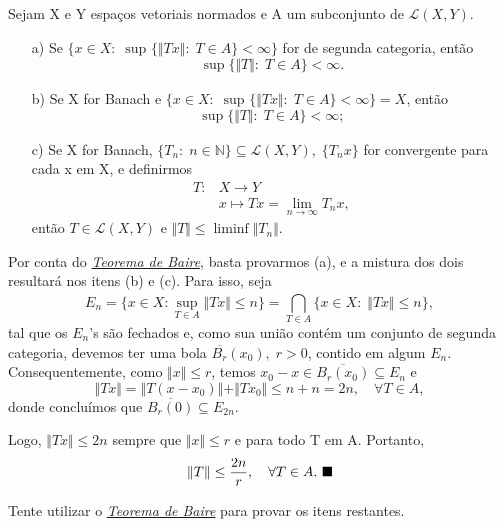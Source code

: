 \documentclass[../functional_analysis.tex]{subfiles}
\begin{document}
\hypertarget{uniform_limitation}{
	\begin{theorem*}
		Sejam X e Y espaços vetoriais normados e A um subconjunto de \(\mathcal{L}(X, Y)\).
		\begin{itemize}
			\item[a)] Se \(\{x\in X:\; \sup_{}\{\Vert Tx \Vert:\; T\in A\} < \infty\}\) for de segunda categoria, então
			      \[
				      \sup_{}\{\Vert T \Vert:\; T\in A\} < \infty.
			      \]
			\item[b)] Se X for Banach e \(\{x\in X:\; \sup_{}\{\Vert Tx \Vert:\; T\in A\} < \infty\} = X\), então
			      \[
				      \sup_{}\{\Vert T \Vert:\; T\in A\} < \infty;
			      \]
			\item[c)] Se X for Banach, \(\{T_{n}:\; n\in \mathbb{N}\} \subseteq \mathcal{L}(X, Y),\; \{T_{n}x\}\) for convergente para cada x em X, e definirmos
			      \begin{align*}
				      T: & X\rightarrow Y                              \\
				         & x\longmapsto Tx = \lim_{n\to \infty}T_{n}x,
			      \end{align*}
			      então \(T\in \mathcal{L}(X, Y)\) e \(\Vert T \Vert \leq \liminf \Vert T_{n} \Vert.\)
		\end{itemize}
	\end{theorem*}
}
\begin{proof*}
	Por conta do \hyperlink{baire_theorem}{\textit{Teorema de Baire}}, basta provarmos (a), e a mistura dos dois resultará nos itens (b) e (c). Para isso, seja
	\[
		E_{n} = \{x\in X: \sup_{T\in A}\Vert Tx \Vert\leq n\} = \bigcap_{T\in A}^{}\{x\in X:\; \Vert Tx \Vert \leq n\},
	\]
	tal que os \(E_{n}\)'s são fechados e, como sua união contém um conjunto de segunda categoria, devemos ter uma bola \(\overline{B_r}(x_{0}),\; r > 0\), contido em algum \(E_{n}\).
	Consequentemente, como \(\Vert x \Vert \leq r\), temos \(x_{0}-x\in \overline{B_r(x_{0})}\subseteq E_{n}\) e
	\[
		\Vert Tx \Vert = \Vert T(x-x_{0}) \Vert + \Vert Tx_{0} \Vert \leq n+n = 2n, \quad \forall T\in A,
	\]
	donde concluímos que \(\overline{B_r(0)}\subseteq E_{2n}\).

	Logo, \(\Vert Tx \Vert \leq 2n\) sempre que \(\Vert x \Vert \leq r\) e para todo T em A. Portanto,
	\[
		\Vert T \Vert \leq \frac{2n}{r}, \quad \forall T\in A. \text{ $\blacksquare$}
	\]
\end{proof*}
\begin{exr}
	Tente utilizar o \hyperlink{baire_theorem}{\textit{Teorema de Baire}} para provar os itens restantes.
\end{exr}
\end{document}
